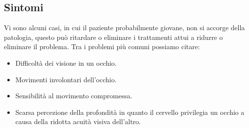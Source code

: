 \documentclass[10pt,a4paper]{article}
\begin{document}
	\subsection{Sintomi}
	Vi sono alcuni casi, in cui il paziente probabilmente giovane, non si accorge della patologia, questo può ritardare o eliminare i trattamenti attui a ridurre o eliminare il problema.
	Tra i problemi più comuni possiamo citare:	   
	\begin{itemize}
		\item Difficoltà dei visione in un occhio.
		\item Movimenti involontari dell'occhio.
		\item Sensibilità al movimento compromessa.
		\item Scarsa percezione della profondità in quanto il cervello privilegia un occhio a causa della ridotta acuità visiva dell'altro.
	\end{itemize} 
\newpage   
\end{document}
